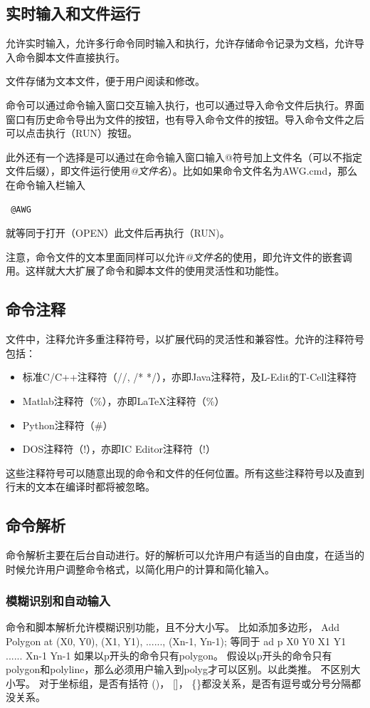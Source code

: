 \subsection{实时输入和文件运行} \label{SectCmdInput} 
允许实时输入，允许多行命令同时输入和执行，允许存储命令记录为文档，允许导入命令脚本文件直接执行。

文件存储为文本文件，便于用户阅读和修改。

命令可以通过命令输入窗口交互输入执行，也可以通过导入命令文件后执行。界面窗口有历史命令导出为文件的按钮，也有导入命令文件的按钮。导入命令文件之后可以点击执行（RUN）按钮。

此外还有一个选择是可以通过在命令输入窗口输入@符号加上文件名（可以不指定文件后缀），即文件运行使用\emph{@文件名}）。比如如果命令文件名为AWG.cmd，那么在命令输入栏输入
\begin{verbatim} @AWG \end{verbatim} 
就等同于打开（OPEN）此文件后再执行（RUN)。

注意，命令文件的文本里面同样可以允许\emph{@文件名}的使用，即允许文件的嵌套调用。这样就大大扩展了命令和脚本文件的使用灵活性和功能性。

\subsection{命令注释} \label{SectCmdComment} 
文件中，注释允许多重注释符号，以扩展代码的灵活性和兼容性。允许的注释符号包括：
\begin{itemize}
	\item 标准C/C++注释符（//, /* */），亦即Java注释符，及L-Edit的T-Cell注释符
	\item Matlab注释符（\%），亦即LaTeX注释符（\%）
	\item Python注释符（\#）
	\item DOS注释符（!），亦即IC Editor注释符（!）
\end{itemize}

这些注释符号可以随意出现的命令和文件的任何位置。所有这些注释符号以及直到行末的文本在编译时都将被忽略。

\subsection{命令解析} \label{SectCmdIntrp} 
命令解析主要在后台自动进行。好的解析可以允许用户有适当的自由度，在适当的时候允许用户调整命令格式，以简化用户的计算和简化输入。
\subsubsection{模糊识别和自动输入} \label{SectCmdFuzy} 
命令和脚本解析允许模糊识别功能，且不分大小写。
比如添加多边形，
Add Polygon at (X0, Y0),  (X1, Y1), ......, (Xn-1, Yn-1);
等同于
ad p X0 Y0 X1 Y1 ...... Xn-1 Yn-1
如果以p开头的命令只有polygon。
假设以p开头的命令只有polygon和polyline，那么必须用户输入到polyg才可以区别。以此类推。
不区别大小写。
对于坐标组，是否有括符 ()， []， \{\}都没关系，是否有逗号或分号分隔都没关系。

